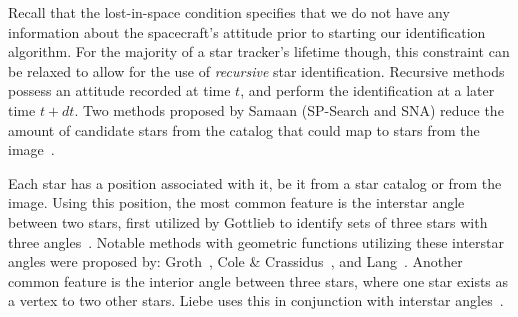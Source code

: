 \documentclass[conference]{IEEEtran}
\begin{document}
    Recall that the lost-in-space condition specifies that we do not have any information about the spacecraft's attitude
    prior to starting our identification algorithm.
    For the majority of a star tracker's lifetime though, this constraint can be relaxed to allow for the use of
    \textit{recursive} star identification.
    Recursive methods possess an attitude recorded at time $t$, and perform the identification at a later time $t + dt$.
    Two methods proposed by Samaan (SP-Search and SNA) reduce the amount of candidate stars from the catalog that could
    map to stars from the image~\cite{samaan:recursiveMode}.

    Each star has a position associated with it, be it from a star catalog or from the image.
    Using this position, the most common feature is the interstar angle between two stars, first utilized by Gottlieb to
    identify sets of three stars with three angles~\cite{gottlieb:spacecraftAttitudeDetermination}.
    Notable methods with geometric functions utilizing these interstar angles were proposed by:
    Groth~\cite{groth:patternMatchingMethod}, Cole \&
    Crassidus~\cite{coleAndCrassidis:sphericalTriangleMethod,coleAndCrassidis:planarTriangleMethod}, and
    Lang~\cite{lang:astrometryDotNet}.
    Another common feature is the interior angle between three stars, where one star exists as a vertex to two other stars.
    Liebe uses this in conjunction with interstar angles~\cite{liebe:starTrackersAttitudeDetermination}.

\end{document}
